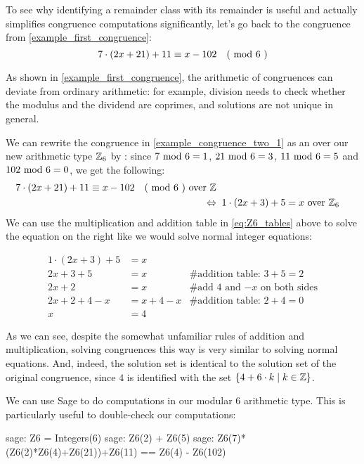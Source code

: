 \begin{example} 
To see why identifying a remainder class with its remainder is useful and actually simplifies congruence computations significantly, let's go back to the congruence from \examplename{} \ref{example_first_congruence}:
\begin{equation}
\label{example_congruence_two_1}
7\cdot(2x+21) + 11 \equiv x-102 \quad \text{( mod } 6 \text{ )}
\end{equation}

As shown in \examplename{} \ref{example_first_congruence}, the arithmetic of congruences can deviate from ordinary arithmetic: for example, division needs to check whether the modulus and the dividend are coprimes, and solutions are not unique in general.

We can rewrite the congruence  in \eqref{example_congruence_two_1} as an  over our new arithmetic type $\mathbb{Z}_6$ by : since $7 \text{ mod } 6= 1$, $21 \text{ mod } 6= 3$, $11 \text{ mod } 6= 5$ and $102 \text{ mod } 6= 0$, we get the following:
\begin{align*}
7\cdot(2x+21) + 11 \equiv x-102 \quad \text{( mod } 6 \text{ )} \text{ over } \mathbb{Z}\\
\Leftrightarrow & \; \; 1\cdot (2x+3) + 5 = x \text{ over } \mathbb{Z}_6
\end{align*}
We can use the multiplication and addition table in \eqref{eq:Z6_tables} above to solve the equation on the right like we would solve normal integer equations:

\begin{align*}
1\cdot (2x+3) + 5 &= x & \text{ }\\
2x+3 + 5 &= x & \text{\# addition table: } 3+5 = 2 \\
2x+2 &= x & \text{\# add 4 and $-x$ on both sides} \\
2x+2 +4 -x &= x + 4 -x & \text{\# addition  table: } 2+4 = 0 \\
x &= 4 &
\end{align*}

As we can see, despite the somewhat unfamiliar rules of addition and multiplication, solving congruences this way is very similar to solving normal equations. And, indeed, the solution set is identical to the solution set of the original congruence, since $4$ is identified with the set $\{4+6\cdot k\;|\; k\in\mathbb{Z}\}$.

We can use  Sage to do computations in our modular $6$ arithmetic type. This is particularly useful to double-check our computations:
\begin{sagecommandline}
sage: Z6 = Integers(6)
sage: Z6(2) + Z6(5)
sage: Z6(7)*(Z6(2)*Z6(4)+Z6(21))+Z6(11) == Z6(4) - Z6(102)
\end{sagecommandline}
\end{example}

